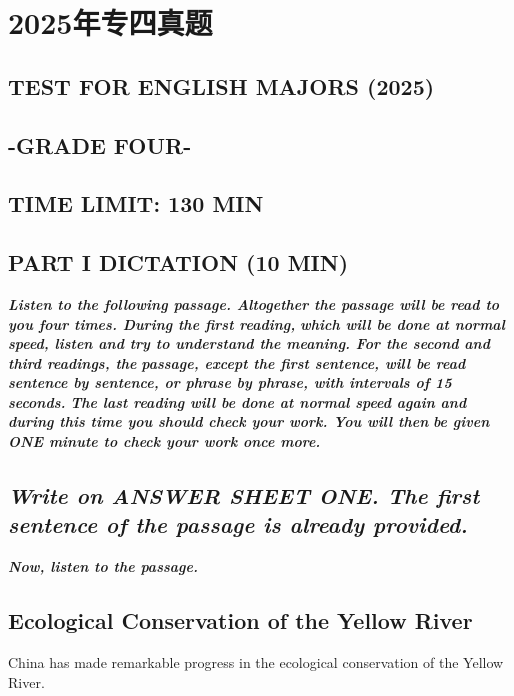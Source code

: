 \documentclass[UTF8,11pt]{ctexart}
\begin{document}
\section*{2025年专四真题}
\subsection*{\textbf{TEST} \textbf{FOR} \textbf{ENGLISH} \textbf{MAJORS (2025)}}


\subsection*{\textbf{-GRADE FOUR-}}


\subsection*{\textbf{TIME LIMIT: 130 MIN}}


\subsection*{\textbf{PART I DICTATION (10 MIN})}


\textbf{\textit{Listen to the following passage. Altogether the passage will be read to you four times. During the first reading,}} \textbf{\textit{which will be done at normal speed, listen and try to understand the meaning. For the second and third readings, the}} \textbf{\textit{passage, except the first sentence, will be read sentence by sentence, or phrase by phrase, with intervals of 15 seconds.}} \textbf{\textit{The last reading will be done at normal speed again and during this time you should check your work. You will then}} \textbf{\textit{be given ONE minute to check your work once more.}}


\subsection*{\textbf{\textit{Write on ANSWER SHEET ONE. The first sentence of the passage is already provided.}}}


\textbf{\textit{Now, listen to the passage.}}


\subsection*{\textbf{Ecological Conservation of the Yellow River}}


China has made remarkable progress in the ecological conservation of the Yellow River.
\end{document}

